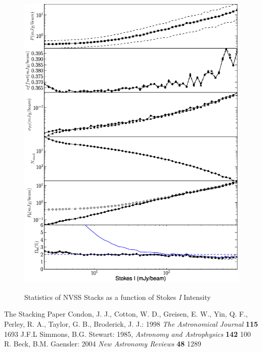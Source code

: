 \documentclass{article}
\begin{document}
\begin{figure}[H]
\begin{center}
\includegraphics[trim=2cm 0cm 0cm 0cm, clip, scale=0.61]{NVSS.eps}\\
\end{center}
\caption[NVSS Stacking Statistics]{Statistics of NVSS Stacks as a function of 
Stokes \emph{I} Intensity}
\end{figure}


\renewcommand{\refname}{\section{References}}
\begin{thebibliography}{1}
 The Stacking Paper
	Condon, J. J., Cotton, W. D., Greisen, E. W., Yin, Q. F., 
	Perley, R. A., Taylor, G. B., Broderick, J. J.: 1998
	\emph{The Astronomical Journal} {\bf 115} 1693
	J.F.L Simmons, B.G. Stewart: 1985, 
	\emph{Astronomy and Astrophysics} {\bf 142} 100
	R. Beck, B.M. Gaensler: 2004
	\emph{New Astronomy Reviews} {\bf 48} 1289
\end{thebibliography}
\end{document}

